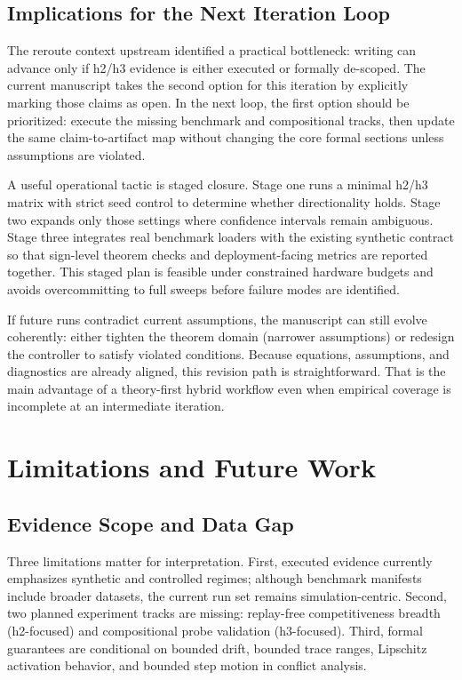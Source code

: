 \documentclass{article} %
\begin{document}
\subsection{Implications for the Next Iteration Loop}
The reroute context upstream identified a practical bottleneck: writing can advance only if h2/h3 evidence is either executed or formally de-scoped. The current manuscript takes the second option for this iteration by explicitly marking those claims as open. In the next loop, the first option should be prioritized: execute the missing benchmark and compositional tracks, then update the same claim-to-artifact map without changing the core formal sections unless assumptions are violated.

A useful operational tactic is staged closure. Stage one runs a minimal h2/h3 matrix with strict seed control to determine whether directionality holds. Stage two expands only those settings where confidence intervals remain ambiguous. Stage three integrates real benchmark loaders with the existing synthetic contract so that sign-level theorem checks and deployment-facing metrics are reported together. This staged plan is feasible under constrained hardware budgets and avoids overcommitting to full sweeps before failure modes are identified.

If future runs contradict current assumptions, the manuscript can still evolve coherently: either tighten the theorem domain (narrower assumptions) or redesign the controller to satisfy violated conditions. Because equations, assumptions, and diagnostics are already aligned, this revision path is straightforward. That is the main advantage of a theory-first hybrid workflow even when empirical coverage is incomplete at an intermediate iteration.

\section{Limitations and Future Work}
\subsection{Evidence Scope and Data Gap}
Three limitations matter for interpretation. First, executed evidence currently emphasizes synthetic and controlled regimes; although benchmark manifests include broader datasets, the current run set remains simulation-centric. Second, two planned experiment tracks are missing: replay-free competitiveness breadth (h2-focused) and compositional probe validation (h3-focused). Third, formal guarantees are conditional on bounded drift, bounded trace ranges, Lipschitz activation behavior, and bounded step motion in conflict analysis.
\end{document}
